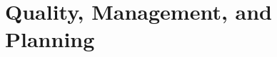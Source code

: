 \documentclass[a4paper,11pt]{article}
\begin{document}
%

\vspace*{-0.2in}

\section{Quality, Management, and Planning}
\end{document}
